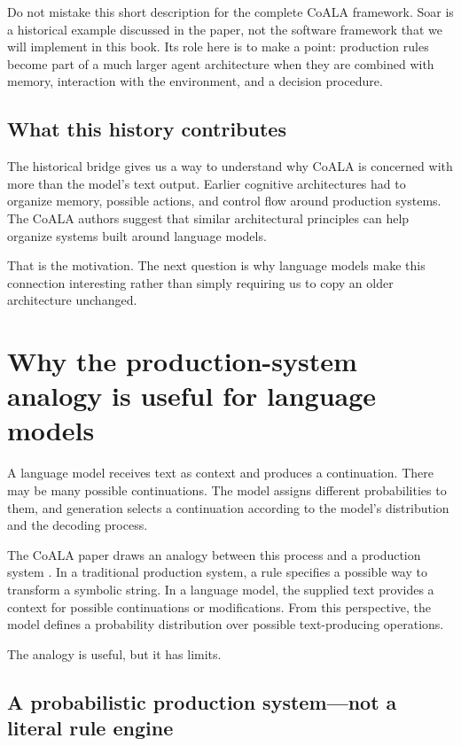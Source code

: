 Do not mistake this short description for the complete CoALA framework. Soar is a historical example discussed in the paper, not the software framework that we will implement in this book. Its role here is to make a point: production rules become part of a much larger agent architecture when they are combined with memory, interaction with the environment, and a decision procedure.

\subsection{What this history contributes}\label{what-this-history-contributes}

The historical bridge gives us a way to understand why CoALA is concerned with more than the model's text output. Earlier cognitive architectures had to organize memory, possible actions, and control flow around production systems. The CoALA authors suggest that similar architectural principles can help organize systems built around language models.

That is the motivation. The next question is why language models make this connection interesting rather than simply requiring us to copy an older architecture unchanged.

\section{Why the production-system analogy is useful for language models}\label{why-the-production-system-analogy-is-useful-for-language-models}

A language model receives text as context and produces a continuation. There may be many possible continuations. The model assigns different probabilities to them, and generation selects a continuation according to the model's distribution and the decoding process.

The CoALA paper draws an analogy between this process and a production system . In a traditional production system, a rule specifies a possible way to transform a symbolic string. In a language model, the supplied text provides a context for possible continuations or modifications. From this perspective, the model defines a probability distribution over possible text-producing operations.

The analogy is useful, but it has limits.

\subsection{A probabilistic production system---not a literal rule engine}\label{a-probabilistic-production-systemnot-a-literal-rule-engine}

